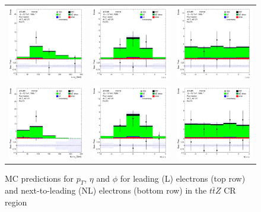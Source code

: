 \clearpage
\begin{figure}[htbp]
    \centering
  \begin{tabular}{ccc}


    \includegraphics[width=.2\textwidth]{figures/PreFitPlots/lep4_ttZ_4T_L_el_pt} &
    \includegraphics[width=.2\textwidth]{figures/PreFitPlots/lep4_ttZ_4T_L_el_eta} &
    \includegraphics[width=.2\textwidth]{figures/PreFitPlots/lep4_ttZ_4T_L_el_phi} \\
    \includegraphics[width=.2\textwidth]{figures/PreFitPlots/lep4_ttZ_4T_NL_el_pt} &
    \includegraphics[width=.2\textwidth]{figures/PreFitPlots/lep4_ttZ_4T_NL_el_eta} &
    \includegraphics[width=.2\textwidth]{figures/PreFitPlots/lep4_ttZ_4T_NL_el_phi} \\

  \end{tabular}
    \caption{MC predictions for $p_{T}$, $\eta$ and $\phi$ for leading (L) electrons (top row) and next-to-leading (NL) electrons (bottom row) in the $t\bar{t}Z$ CR region }
  \label{fig:4lep-ttZ-CR-electronPlots}
\end{figure}



